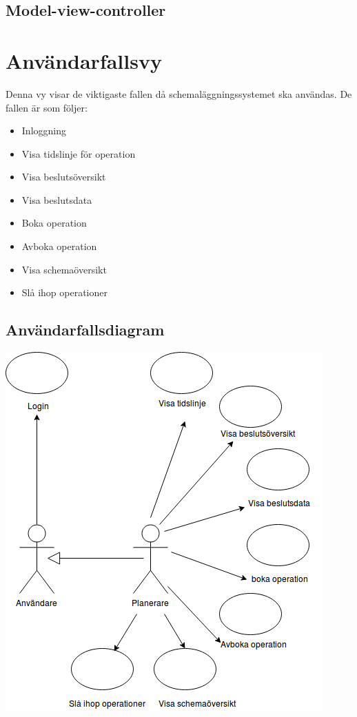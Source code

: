 \documentclass[a4paper,10pt]{article}
\begin{document}
\subsection{Model-view-controller}


\section{Användarfallsvy}

Denna vy visar de viktigaste fallen då schemaläggningssystemet ska användas. De fallen är som följer:
\begin{itemize}
	\item Inloggning
	\item Visa tidslinje för operation
	\item Visa beslutsöversikt
	\item Visa beslutsdata
	\item Boka operation
	\item Avboka operation
	\item Visa schemaöversikt
	\item Slå ihop operationer
\end{itemize}
\subsection{Användarfallsdiagram}
\includegraphics[width=\textwidth,height=\textheight,keepaspectratio]{Usecasediagram.png}
\clearpage
\end{document}
